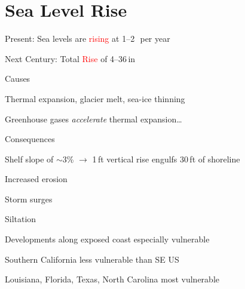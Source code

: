 \documentclass[12pt]{article}
\begin{document}
\section[Sea Level Rise]{Sea Level Rise}
\begin{itemize*}
\item Present: Sea levels are \textcolor{red}{rising} at 1--2\,\mm\ per year
\item Next Century: Total \textcolor{red}{Rise} of 4--36\,in
\begin{itemize*}
\item Causes
\begin{itemize*}
\item Thermal expansion, glacier melt, sea-ice thinning
\item Greenhouse gases \textit{accelerate} thermal expansion\ldots
\end{itemize*}
\item Consequences
\begin{itemize*}
\item Shelf slope of $\sim$3\% $\rightarrow$ 1\,ft vertical rise engulfs 30\,ft of shoreline
\item Increased erosion
\item Storm surges
\item Siltation
\end{itemize*}
\item Developments along exposed coast especially vulnerable
\begin{itemize*}
\item Southern California less vulnerable than SE US
\item Louisiana, Florida, Texas, North Carolina most vulnerable
\end{itemize*}
\end{itemize*}
\end{itemize*}
\vfill
\end{document}
